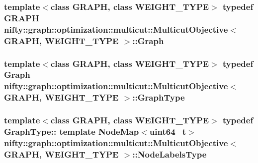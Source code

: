 \subsubsection[{Graph}]{\setlength{\rightskip}{0pt plus 5cm}template$<$class G\+R\+A\+P\+H, class W\+E\+I\+G\+H\+T\+\_\+\+T\+Y\+P\+E$>$ typedef G\+R\+A\+P\+H {\bf nifty\+::graph\+::optimization\+::multicut\+::\+Multicut\+Objective}$<$ G\+R\+A\+P\+H, W\+E\+I\+G\+H\+T\+\_\+\+T\+Y\+P\+E $>$\+::{\bf Graph}}\label{classnifty_1_1graph_1_1optimization_1_1multicut_1_1MulticutObjective_a1c21fc7303fc25b19dbdf833215a9356}
\hypertarget{classnifty_1_1graph_1_1optimization_1_1multicut_1_1MulticutObjective_a4a7b943a30fc6ef52c0debbe245e1fe6}{}
\subsubsection[{Graph\+Type}]{\setlength{\rightskip}{0pt plus 5cm}template$<$class G\+R\+A\+P\+H, class W\+E\+I\+G\+H\+T\+\_\+\+T\+Y\+P\+E$>$ typedef {\bf Graph} {\bf nifty\+::graph\+::optimization\+::multicut\+::\+Multicut\+Objective}$<$ G\+R\+A\+P\+H, W\+E\+I\+G\+H\+T\+\_\+\+T\+Y\+P\+E $>$\+::{\bf Graph\+Type}}\label{classnifty_1_1graph_1_1optimization_1_1multicut_1_1MulticutObjective_a4a7b943a30fc6ef52c0debbe245e1fe6}
\hypertarget{classnifty_1_1graph_1_1optimization_1_1multicut_1_1MulticutObjective_ac07bec2c4a1568c3fb99e2018532ad7e}{}
\subsubsection[{Node\+Labels\+Type}]{\setlength{\rightskip}{0pt plus 5cm}template$<$class G\+R\+A\+P\+H, class W\+E\+I\+G\+H\+T\+\_\+\+T\+Y\+P\+E$>$ typedef Graph\+Type\+:: template Node\+Map$<$uint64\+\_\+t$>$ {\bf nifty\+::graph\+::optimization\+::multicut\+::\+Multicut\+Objective}$<$ G\+R\+A\+P\+H, W\+E\+I\+G\+H\+T\+\_\+\+T\+Y\+P\+E $>$\+::{\bf Node\+Labels\+Type}}\label{classnifty_1_1graph_1_1optimization_1_1multicut_1_1MulticutObjective_ac07bec2c4a1568c3fb99e2018532ad7e}
\hypertarget{classnifty_1_1graph_1_1optimization_1_1multicut_1_1MulticutObjective_a3aa13d9db4ea3f97c54f87da9e669d1b}{}
